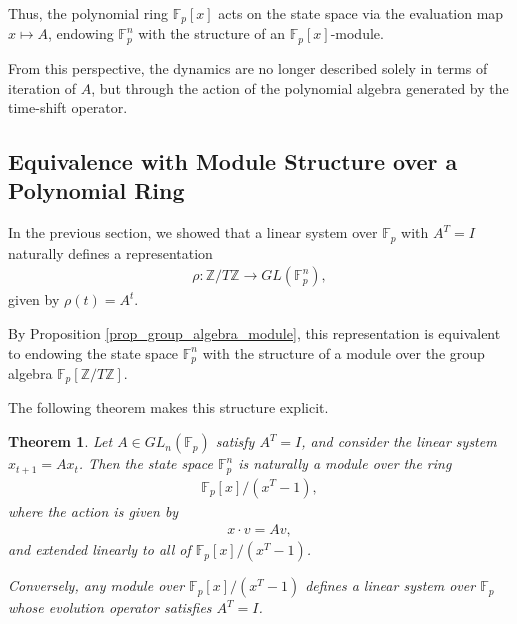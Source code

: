 \documentclass[letterpaper, 9pt, conference]{ieeeconf}
\newtheorem{theorem}{Theorem}
\begin{document}
Thus, the polynomial ring $\mathbb{F}_p[x]$ acts on the state space via the
evaluation map $x \mapsto A$, endowing $\mathbb{F}_p^n$ with the structure of
an $\mathbb{F}_p[x]$-module.

From this perspective, the dynamics are no longer described solely in terms of
iteration of $A$, but through the action of the polynomial algebra generated by
the time-shift operator.

\subsection{Equivalence with Module Structure over a Polynomial Ring}

In the previous section, we showed that a linear system over
$\mathbb{F}_p$ with $A^T = I$ naturally defines a representation
\begin{eqnarray}
\rho : \mathbb{Z}/T\mathbb{Z} \to GL(\mathbb{F}_p^n),
\end{eqnarray}
given by $\rho(t) = A^t$.

By Proposition \ref{prop_group_algebra_module}, this representation is
equivalent to endowing the state space $\mathbb{F}_p^n$ with the structure
of a module over the group algebra $\mathbb{F}_p[\mathbb{Z}/T\mathbb{Z}]$.

The following theorem makes this structure explicit.

\begin{theorem}
Let $A \in GL_n(\mathbb{F}_p)$ satisfy $A^T = I$, and consider the linear
system $x_{t+1} = Ax_t$. Then the state space $\mathbb{F}_p^n$ is naturally
a module over the ring
\begin{eqnarray}
\mathbb{F}_p[x]/(x^T - 1),
\end{eqnarray}
where the action is given by
\begin{eqnarray}
x \cdot v = Av,
\end{eqnarray}
and extended linearly to all of $\mathbb{F}_p[x]/(x^T - 1)$.

Conversely, any module over $\mathbb{F}_p[x]/(x^T - 1)$ defines a linear
system over $\mathbb{F}_p$ whose evolution operator satisfies $A^T = I$.
\end{theorem}
\end{document}
